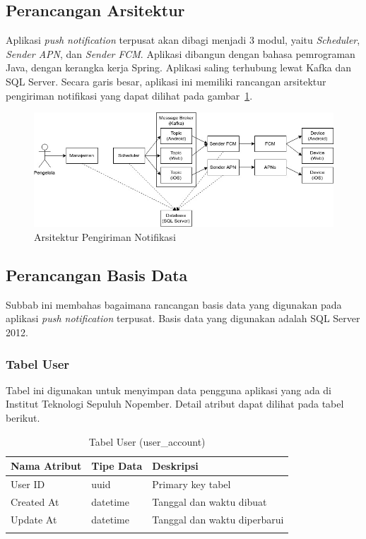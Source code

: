 \subsection{Perancangan Arsitektur}
\par Aplikasi \textit{push notification} terpusat akan dibagi menjadi 3 modul, yaitu \textit{Scheduler},
\textit{Sender APN}, dan \textit{Sender FCM}.
Aplikasi dibangun dengan bahasa pemrograman Java, dengan kerangka kerja
Spring.
Aplikasi saling terhubung lewat Kafka dan SQL Server.
Secara garis besar, aplikasi ini memiliki rancangan
arsitektur pengiriman notifikasi yang dapat dilihat pada gambar~\ref{arsitektur_pengiriman_notifikasi}.
\begin{figure}[H]
    \centering\includegraphics[width=1\textwidth]{bab3/figures/arsitektur_pengiriman_notifikasi.jpg}
    \caption{Arsitektur Pengiriman Notifikasi}
    \label{arsitektur_pengiriman_notifikasi}
\end{figure}

\subsection{Perancangan Basis Data}
\par Subbab ini membahas bagaimana rancangan basis data yang digunakan pada aplikasi \textit{push notification} terpusat. Basis data yang digunakan adalah SQL Server 2012.

\subsubsection{Tabel User}
\par Tabel ini digunakan untuk menyimpan data pengguna aplikasi yang ada di Institut Teknologi Sepuluh Nopember. Detail atribut dapat dilihat pada tabel berikut.
\begin{longtable}{|p{2.5cm}|p{2cm}|p{4.5cm}|}
    \hline
    \textbf{Nama Atribut} & \textbf{Tipe Data} & \textbf{Deskripsi} \\ \hline
    User ID & uuid & Primary key tabel \\ \hline
    Created At & datetime & Tanggal dan waktu dibuat \\ \hline
    Update At & datetime & Tanggal dan waktu diperbarui \\ \hline
    \caption{Tabel User (user\_account)}
\end{longtable}

